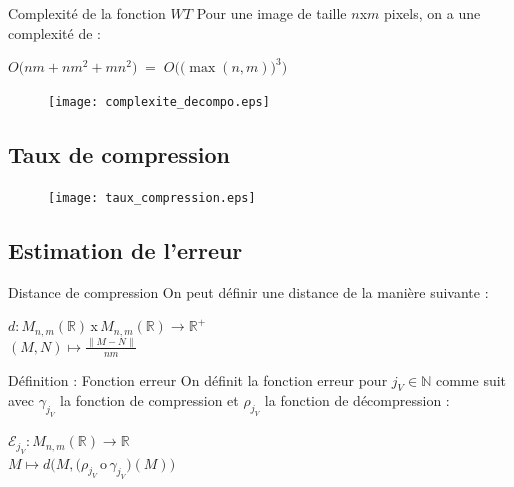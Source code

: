 \documentclass[10pt]{beamer}
\begin{document}
      \begin{frame}
	\begin{beamerboxesrounded}[scheme=prop]{Complexit\'{e} de la fonction $WT$}
	  Pour une image de taille $n$x$m$ pixels, on a une complexit\'{e} de :
	  \begin{center}
	    $ \boxed{O \Big(nm + n m^2 + m n^2 \Big) \; = \; O \Big( \big(\max(n,m)\big)^3 \Big)} $
	  \end{center}
	\end{beamerboxesrounded}
	  
	\begin{figure}[H]
	    \centering
	    \texttt{[image: complexite\_decompo.eps]}
	\end{figure}
      \end{frame}
    
    \subsection{Taux de compression}

      \begin{frame}
	\begin{figure}[!h]
	    \centering
	    \texttt{[image: taux\_compression.eps]}
	\end{figure}
      \end{frame}
    
    \subsection{Estimation de l'erreur}

      \begin{frame}
	\begin{beamerboxesrounded}[scheme=prop]{Distance de compression}
	  On peut d\'{e}finir une distance de la mani\`{e}re suivante :
	  \begin{center}
	    $d : M_{n,m}(\mathbb{R}) \, $x$ \, M_{n,m}(\mathbb{R}) \longrightarrow \mathbb{R}^+ $ \\
	    $ (M, N) \longmapsto \frac{\parallel M - N \parallel}{n m} $
	  \end{center}
	\end{beamerboxesrounded}

	\begin{beamerboxesrounded}[scheme=def]{D\'{e}finition : Fonction erreur}
	  On d\'{e}finit la fonction erreur pour $j_V \in \mathbb{N}$ comme suit avec $\gamma_{j_V}$ la fonction de compression 
	    et $\rho_{j_V}$ la fonction de d\'{e}compression :
	  \begin{center}
	    $\mathcal{E}_{j_V} : M_{n,m}(\mathbb{R}) \longrightarrow \mathbb{R}  $ \\
	    $M \longmapsto d \Bigg(M, \Big(\rho_{j_V} \, $o$ \, \gamma_{j_V}\Big)(M) \Bigg)$
	  \end{center}
	\end{beamerboxesrounded}
	
      \end{frame}
      
\end{document}
